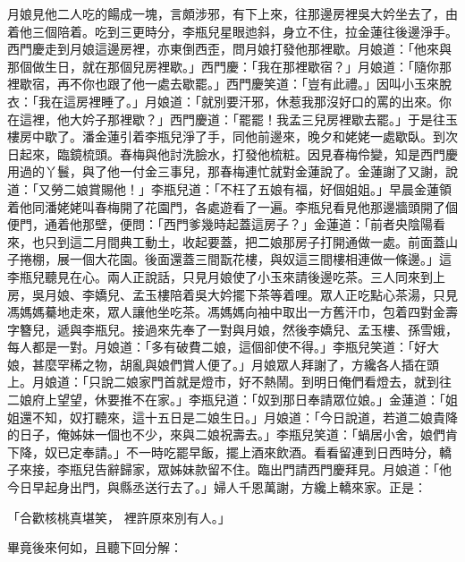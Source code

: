 月娘見他二人吃的餳成一塊，言頗涉邪，有下上來，往那邊房裡吳大妗坐去了，由着他三個陪着。吃到三更時分，李瓶兒星眼迆斜，身立不住，拉金蓮往後邊淨手。西門慶走到月娘這邊房裡，亦東倒西歪，問月娘打發他那裡歇。月娘道：「他來與那個做生日，就在那個兒房裡歇。」西門慶：「我在那裡歇宿？」月娘道：「隨你那裡歇宿，再不你也跟了他一處去歇罷。」西門慶笑道：「豈有此禮。」因叫小玉來脫衣：「我在這房裡睡了。」月娘道：「就別要汗邪，休惹我那沒好口的罵的出來。你在這裡，他大妗子那裡歇？」西門慶道：「罷罷！我孟三兒房裡歇去罷。」于是往玉樓房中歇了。潘金蓮引着李瓶兒淨了手，同他前邊來，晚夕和姥姥一處歇臥。到次日起來，臨鏡梳頭。春梅與他討洗臉水，打發他梳粧。因見春梅伶變，知是西門慶用過的丫鬟，與了他一付金三事兒，那春梅連忙就對金蓮說了。金蓮謝了又謝，說道：「又勞二娘賞賜他！」李瓶兒道：「不枉了五娘有福，好個姐姐。」早晨金蓮領着他同潘姥姥叫春梅開了花園門，各處遊看了一遍。李瓶兒看見他那邊牆頭開了個便門，通着他那壁，便問：「西門爹幾時起蓋這房子？」金蓮道：「前者央陰陽看來，也只到這二月間典工動土，收起要蓋，把二娘那房子打開通做一處。前面蓋山子捲棚，展一個大花園。後面還蓋三間翫花樓，與奴這三間樓相連做一條邊。」這李瓶兒聽見在心。兩人正說話，只見月娘使了小玉來請後邊吃茶。三人同來到上房，吳月娘、李嬌兒、孟玉樓陪着吳大妗擺下茶等着哩。眾人正吃點心茶湯，只見馮媽媽驀地走來，眾人讓他坐吃茶。馮媽媽向袖中取出一方舊汗巾，包着四對金壽字簪兒，遞與李瓶兒。接過來先奉了一對與月娘，然後李嬌兒、孟玉樓、孫雪娥，每人都是一對。月娘道：「多有破費二娘，這個卻使不得。」李瓶兒笑道：「好大娘，甚麼罕稀之物，胡亂與娘們賞人便了。」月娘眾人拜謝了，方纔各人插在頭上。月娘道：「只說二娘家門首就是燈市，好不熱鬧。到明日俺們看燈去，就到往二娘府上望望，休要推不在家。」李瓶兒道：「奴到那日奉請眾位娘。」金蓮道：「姐姐還不知，奴打聽來，這十五日是二娘生日。」月娘道：「今日說道，若道二娘貴降的日子，俺姊妹一個也不少，來與二娘祝壽去。」李瓶兒笑道：「蝸居小舍，娘們肯下降，奴已定奉請。」不一時吃罷早飯，擺上酒來飲酒。看看留連到日西時分，轎子來接，李瓶兒告辭歸家，眾姊妹款留不住。臨出門請西門慶拜見。月娘道：「他今日早起身出門，與縣丞送行去了。」婦人千恩萬謝，方纔上轎來家。正是：

「合歡核桃真堪笑，  裡許原來別有人。」

畢竟後來何如，且聽下回分解：


